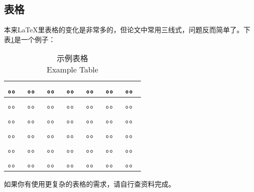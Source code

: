 \subsection{表格}
\par 本来LaTeX里表格的变化是非常多的，但论文中常用三线式，问题反而简单了。下表\ref{tableExample}是一个例子：
\begin{table}[htbp]\center
    \caption{示例表格\\Example Table}
    \begin{tabular}{lcccccl}
        \toprule
        。。 & 。。 & 。。 & 。。 & 。。& 。。 & 。。\\
        \midrule
        。。 & 。。 & 。。 & 。。 & 。。& 。。 & 。。\\
        。。 & 。。 & 。。 & 。。 & 。。& 。。 & 。。\\
        。。 & 。。 & 。。 & 。。 & 。。& 。。 & 。。\\
        。。 & 。。 & 。。 & 。。 & 。。& 。。 & 。。\\
        。。 & 。。 & 。。 & 。。 & 。。& 。。 & 。。\\
        \bottomrule
    \end{tabular}
    \label{tableExample}
\end{table}
如果你有使用更复杂的表格的需求，请自行查资料完成。